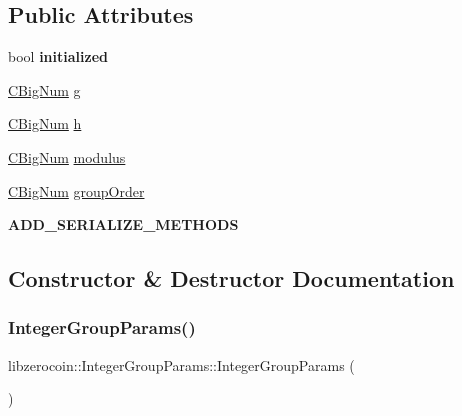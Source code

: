 \subsection*{Public Attributes}
\begin{DoxyCompactItemize}
\item 
\mbox{\label{classlibzerocoin_1_1_integer_group_params_ab39d81c3f6a0270f44fc8571f8b5ad2a}} 
bool {\bfseries initialized}
\item 
\mbox{\hyperlink{class_c_big_num}{C\+Big\+Num}} \mbox{\hyperlink{classlibzerocoin_1_1_integer_group_params_a7ed998ff8bb39de1f52cc12c19d66112}{g}}
\item 
\mbox{\hyperlink{class_c_big_num}{C\+Big\+Num}} \mbox{\hyperlink{classlibzerocoin_1_1_integer_group_params_a23e945fc61cb016c144e22a1cc01e96a}{h}}
\item 
\mbox{\hyperlink{class_c_big_num}{C\+Big\+Num}} \mbox{\hyperlink{classlibzerocoin_1_1_integer_group_params_a2bf8badb9ba3a76672fa10e375fde097}{modulus}}
\item 
\mbox{\hyperlink{class_c_big_num}{C\+Big\+Num}} \mbox{\hyperlink{classlibzerocoin_1_1_integer_group_params_a08c2b09572927d5355cf570d4dc7e1cf}{group\+Order}}
\item 
\mbox{\label{classlibzerocoin_1_1_integer_group_params_abafb238a92ac1a6d109ab7ca54c0020c}} 
{\bfseries A\+D\+D\+\_\+\+S\+E\+R\+I\+A\+L\+I\+Z\+E\+\_\+\+M\+E\+T\+H\+O\+DS}
\end{DoxyCompactItemize}


\subsection{Constructor \& Destructor Documentation}
\mbox{\label{classlibzerocoin_1_1_integer_group_params_ae37d4d4e9c525069a15155e454d7f48e}} 
\subsubsection{\texorpdfstring{IntegerGroupParams()}{IntegerGroupParams()}}
{\footnotesize\ttfamily libzerocoin\+::\+Integer\+Group\+Params\+::\+Integer\+Group\+Params (\begin{DoxyParamCaption}{ }\end{DoxyParamCaption})}



